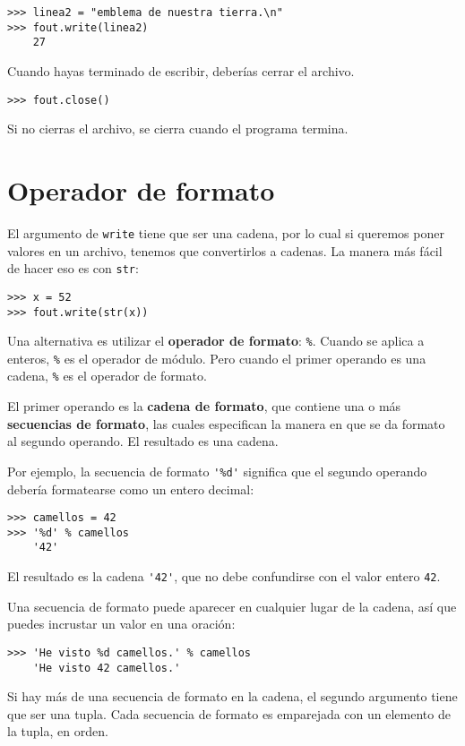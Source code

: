\documentclass[10pt]{book}
\begin{document}
\begin{verbatim}
>>> linea2 = "emblema de nuestra tierra.\n"
>>> fout.write(linea2)
    27
\end{verbatim}
%
Cuando hayas terminado de escribir, deberías cerrar el archivo.

\begin{verbatim}
>>> fout.close()
\end{verbatim}
%
%
Si no cierras el archivo, se cierra cuando el
programa termina.


\section{Operador de formato}

El argumento de {\tt write} tiene que ser una cadena, por lo cual si queremos
poner valores en un archivo, tenemos que convertirlos a
cadenas.  La manera más fácil de hacer eso es con {\tt str}:

\begin{verbatim}
>>> x = 52
>>> fout.write(str(x))
\end{verbatim}
%
Una alternativa es utilizar el {\bf operador de formato}: {\tt \%}.  Cuando
se aplica a enteros, {\tt \%} es el operador de módulo.  Pero
cuando el primer operando es una cadena, {\tt \%} es el operador de formato.

El primer operando es la {\bf cadena de formato}, que contiene
una o más {\bf secuencias de formato}, las cuales
especifican la manera en que
se da formato al segundo operando.  El resultado es una cadena.

Por ejemplo, la secuencia de formato \verb"'%d'" significa que
el segundo operando debería formatearse como un entero
decimal:

\begin{verbatim}
>>> camellos = 42
>>> '%d' % camellos
    '42'
\end{verbatim}
%
El resultado es la cadena \verb"'42'", que no debe confundirse
con el valor entero {\tt 42}.

Una secuencia de formato puede aparecer en cualquier lugar de la cadena,
así que puedes incrustar un valor en una oración:

\begin{verbatim}
>>> 'He visto %d camellos.' % camellos
    'He visto 42 camellos.'
\end{verbatim}
%
Si hay más de una secuencia de formato en la cadena,
el segundo argumento tiene que ser una tupla.  Cada secuencia de formato es
emparejada con un elemento de la tupla, en orden.
\end{document}

